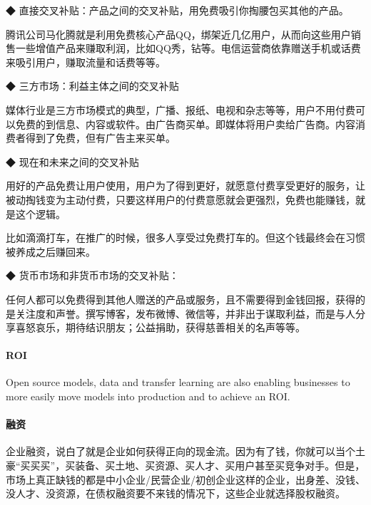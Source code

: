 \documentclass[letterpaper,10pt,english]{sphinxmanual}
\begin{document}
◆ 直接交叉补贴：产品之间的交叉补贴，用免费吸引你掏腰包买其他的产品。

腾讯公司马化腾就是利用免费核心产品QQ，绑架近几亿用户，从而向这些用户销售一些增值产品来赚取利润，比如QQ秀，钻等。电信运营商依靠赠送手机或话费来吸引用户，赚取流量和话费等等。

◆ 三方市场：利益主体之间的交叉补贴

媒体行业是三方市场模式的典型，广播、报纸、电视和杂志等等，用户不用付费可以免费的到信息、内容或软件。由广告商买单。即媒体将用户卖给广告商。内容消费者得到了免费，但有广告主来买单。

◆ 现在和未来之间的交叉补贴

用好的产品免费让用户使用，用户为了得到更好，就愿意付费享受更好的服务，让被动掏钱变为主动付费，只要这样用户的付费意愿就会更强烈，免费也能赚钱，就是这个逻辑。%
\begin{footnote}[151]\sphinxAtStartFootnote
{}
%
\end{footnote}

比如滴滴打车，在推广的时候，很多人享受过免费打车的。但这个钱最终会在习惯被养成之后赚回来。

◆ 货币市场和非货币市场的交叉补贴：

任何人都可以免费得到其他人赠送的产品或服务，且不需要得到金钱回报，获得的是关注度和声誉。撰写博客，发布微博、微信等，并非出于谋取利益，而是与人分享喜怒哀乐，期待结识朋友；公益捐助，获得慈善相关的名声等等。


\paragraph{ROI}
\label{\detokenize{chapter_introduction/money:roi}}
Open source models, data and transfer learning are also enabling
businesses to more easily move models into production and to achieve an
ROI.


\paragraph{融资}
\label{\detokenize{chapter_introduction/money:id26}}
企业融资，说白了就是企业如何获得正向的现金流。因为有了钱，你就可以当个土豪“买买买”，买装备、买土地、买资源、买人才、买用户甚至买竞争对手。但是，市场上真正缺钱的都是中小企业/民营企业/初创企业这样的企业，出身差、没钱、没人才、没资源，在债权融资要不来钱的情况下，这些企业就选择股权融资。
\end{document}
